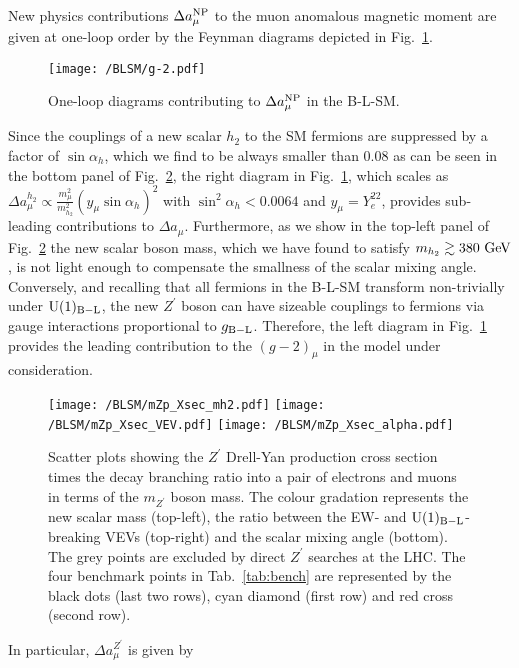 New physics contributions $\Delta a_\mu^{\textrm{NP}}$ to the muon anomalous magnetic moment are given at one-loop order by the Feynman diagrams depicted in Fig.~\ref{fig:g-2}.
\begin{figure}[!htb]
	\centering
	\texttt{[image: /BLSM/g-2.pdf]}
	\caption{One-loop diagrams contributing to $\Delta a_\mu^{\textrm{NP}}$ in the B-L-SM.}
	\label{fig:g-2}
\end{figure}	
Since the couplings of a new scalar $h_2$ to the SM fermions are suppressed by a factor of $\sin \alpha_h$, which we find to be always smaller than $0.08$ as can be seen in the bottom panel of Fig.~\ref{fig:Plots4}, the right diagram in Fig.~\ref{fig:g-2}, which scales as $\Delta a_\mu^{h_2} \propto \tfrac{m_\mu^2}{m_{h_2}^2}\left(y_\mu \sin \alpha_h\right)^2$ with $\sin^2 \alpha_h < 0.0064$ and $y_\mu = Y_e^{22}$, provides sub-leading contributions to $\Delta a_{\mu}$. Furthermore, as we show in the top-left panel of Fig.~\ref{fig:Plots4} the new scalar boson mass, which we have found to satisfy $m_{h_2} \gtrsim 380~\textrm{GeV}$, is not light enough to compensate the smallness of the scalar mixing angle. Conversely, and recalling that all fermions in the B-L-SM transform non-trivially under $\mathrm{U}(1)_{\mathrm{B-L}}$, the new $Z^\prime$ boson can have sizeable couplings to fermions via gauge interactions proportional to $g_{\rm B-L}$. Therefore, the left diagram in Fig.~\ref{fig:g-2} provides the leading contribution to the $\left(g-2\right)_\mu$ in the model under consideration.
\begin{figure}[!htb]
	\centering
	\texttt{[image: /BLSM/mZp\_Xsec\_mh2.pdf]}
	\texttt{[image: /BLSM/mZp\_Xsec\_VEV.pdf]}
	\texttt{[image: /BLSM/mZp\_Xsec\_alpha.pdf]}	
	\caption{Scatter plots showing the $Z^\prime$ Drell-Yan production cross section times the decay branching ratio into a pair of electrons and muons in terms of the $m_{Z^\prime}$ boson mass. The colour gradation represents the new scalar mass (top-left), the ratio between the EW- and $\mathrm{U}(1)_{\mathrm{B-L}}$-breaking VEVs (top-right) and the scalar mixing angle (bottom). The grey points are excluded by direct $Z^\prime$ searches at the LHC. The four benchmark points in Tab.~\ref{tab:bench} are represented by the black dots (last two rows), cyan diamond (first row) and red cross (second row).}
	\label{fig:Plots4}
\end{figure}	
In particular, $\Delta a_\mu^{Z^\prime}$ is given by \cite{Freitas:2014pua}
